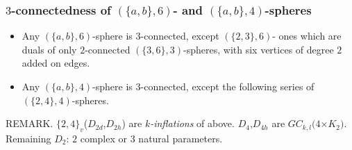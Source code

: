 \documentclass{beamer}
\begin{document}
\begin{frame}\frametitle{$3$-connectedness of 
$(\{a,b\},6)$- and $(\{a,b\},4)$-spheres}
\vspace{-2mm}

\begin{itemize}
\item 
Any $(\{a,b\},6)$-sphere is $3$-connected, except  
$(\{2,3\},6)$- ones which  are duals of only $2$-connected
$(\{3,6\},3)$-spheres, with  six vertices 
of degree $2$
added on  edges.


\item
Any $(\{a,b\},4)$-sphere is $3$-connected, except
the  following series of $(\{2,4\},4)$-spheres.


\end{itemize}

\begin{center}
\begin{minipage}[b]{65mm}
\centering
{}\par
\end{minipage}
\end{center}

REMARK. $\{2,4\}_v$($D_{2d}$,$D_{2h}$)  are
 {\em $k$-inflations} of above. $D_{4}$,$D_{4h}$
are  $GC_{k,l}(4$$\times$$ K_2)$. Remaining $D_2$: $2$ 
complex or $3$ natural  
parameters.
\end{frame}
\end{document}
